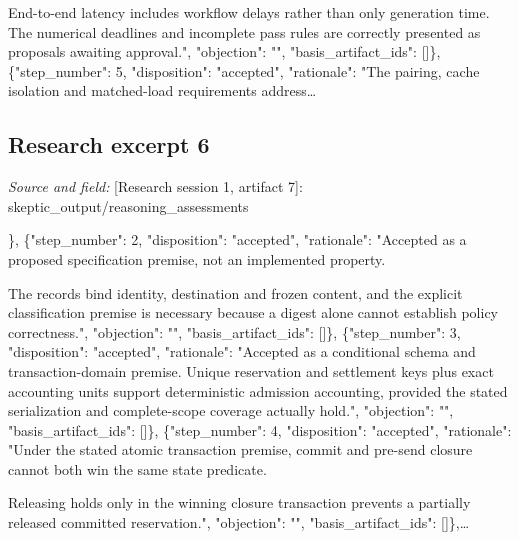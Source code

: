 \documentclass[11pt]{article}
\begin{document}
End-to-end latency includes workflow delays rather than only generation time. The numerical deadlines and incomplete pass rules are correctly presented as proposals awaiting approval.", "objection": "", "basis\_artifact\_ids": []\}, \{"step\_number": 5, "disposition": "accepted", "rationale": "The pairing, cache isolation and matched-load requirements address\ldots{}

\subsection{Research excerpt 6}
\textit{Source and field: }[Research session 1, artifact 7]: skeptic\_output/reasoning\_assessments\par
[\{"step\_number": 1, "disposition": "unresolved", "rationale": "The evidence boundary and retained decision-time and timeout-release limitations are appropriate. However, this review packet contains pointer-only prior artifacts and ledger summaries rather than the described cycle-2 state-machine extract.", "objection": "The claim that supplied source text provides the earlier states cannot be checked here. Request the relevant definitions only; do not treat a pointer or ledger summary as the original argument.", "basis\_artifact\_ids": []\}, \{"step\_number": 2, "disposition": "accepted", "rationale": "Accepted as a proposed specification premise, not an implemented property.

The records bind identity, destination and frozen content, and the explicit classification premise is necessary because a digest alone cannot establish policy correctness.", "objection": "", "basis\_artifact\_ids": []\}, \{"step\_number": 3, "disposition": "accepted", "rationale": "Accepted as a conditional schema and transaction-domain premise. Unique reservation and settlement keys plus exact accounting units support deterministic admission accounting, provided the stated serialization and complete-scope coverage actually hold.", "objection": "", "basis\_artifact\_ids": []\}, \{"step\_number": 4, "disposition": "accepted", "rationale": "Under the stated atomic transaction premise, commit and pre-send closure cannot both win the same state predicate.

Releasing holds only in the winning closure transaction prevents a partially released committed reservation.", "objection": "", "basis\_artifact\_ids": []\},\ldots{}
\end{document}

